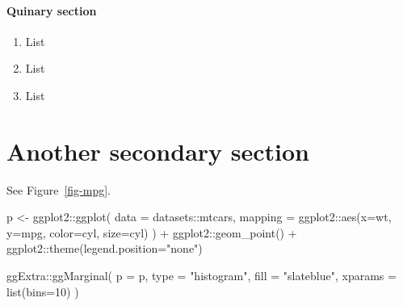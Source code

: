\documentclass[
12pt,
openright,
oneside,
a4paper,
chapter=TITLE,
section=TITLE,
french,
spanish,
brazil,
english
]{abntex2}\usepackage{array}
\let\oldparagraph\paragraph
\renewcommand{\paragraph}[1]{\oldparagraph{#1}\mbox{}}
\newenvironment{Shaded}{\begin{snugshade}}{\end{snugshade}}
\newcommand{\AttributeTok}[1]{\textcolor[rgb]{0.40,0.45,0.13}{#1}}
\newcommand{\DecValTok}[1]{\textcolor[rgb]{0.68,0.00,0.00}{#1}}
\newcommand{\FunctionTok}[1]{\textcolor[rgb]{0.28,0.35,0.67}{#1}}
\newcommand{\NormalTok}[1]{\textcolor[rgb]{0.00,0.23,0.31}{#1}}
\newcommand{\OtherTok}[1]{\textcolor[rgb]{0.00,0.23,0.31}{#1}}
\newcommand{\SpecialCharTok}[1]{\textcolor[rgb]{0.37,0.37,0.37}{#1}}
\newcommand{\StringTok}[1]{\textcolor[rgb]{0.13,0.47,0.30}{#1}}
\theoremstyle{plain}
\theoremstyle{remark}
\begin{document}
\paragraph{Quinary section}\label{quinary-section}

\begin{enumerate}
\def\labelenumi{\arabic{enumi}.}
\tightlist
\item
  List
\item
  List
\item
  List
\end{enumerate}

\section{Another secondary section}\label{another-secondary-section}

See Figure~\ref{fig-mpg}.


\begin{Shaded}
\begin{Highlighting}[numbers=left,,]
\NormalTok{p }\OtherTok{\textless{}{-}}\NormalTok{ ggplot2}\SpecialCharTok{::}\FunctionTok{ggplot}\NormalTok{(}
  \AttributeTok{data =}\NormalTok{ datasets}\SpecialCharTok{::}\NormalTok{mtcars, }
  \AttributeTok{mapping =}\NormalTok{ ggplot2}\SpecialCharTok{::}\FunctionTok{aes}\NormalTok{(}\AttributeTok{x=}\NormalTok{wt, }\AttributeTok{y=}\NormalTok{mpg, }\AttributeTok{color=}\NormalTok{cyl, }\AttributeTok{size=}\NormalTok{cyl)}
\NormalTok{  ) }\SpecialCharTok{+}
\NormalTok{  ggplot2}\SpecialCharTok{::}\FunctionTok{geom\_point}\NormalTok{() }\SpecialCharTok{+}
\NormalTok{  ggplot2}\SpecialCharTok{::}\FunctionTok{theme}\NormalTok{(}\AttributeTok{legend.position=}\StringTok{"none"}\NormalTok{)}

\NormalTok{ggExtra}\SpecialCharTok{::}\FunctionTok{ggMarginal}\NormalTok{(}
  \AttributeTok{p =}\NormalTok{ p, }
  \AttributeTok{type =} \StringTok{"histogram"}\NormalTok{, }
  \AttributeTok{fill =} \StringTok{"slateblue"}\NormalTok{, }
  \AttributeTok{xparams =} \FunctionTok{list}\NormalTok{(}\AttributeTok{bins=}\DecValTok{10}\NormalTok{)}
\NormalTok{)}
\end{Highlighting}
\end{Shaded}
\end{document}
